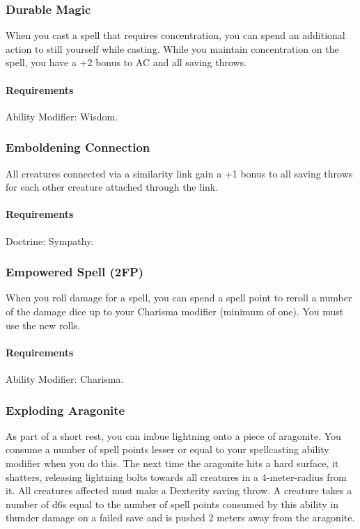 \subsubsection{Durable Magic} \label{feat::durablemagic}
    When you cast a spell that requires concentration, you can spend an additional action to still yourself while casting.
    While you maintain concentration on the spell, you have a +2 bonus to AC and all saving throws.
    \paragraph{Requirements} Ability Modifier: Wisdom.
\subsubsection{Emboldening Connection} \label{feat::emboldeningconnection}
    All creatures connected via a similarity link gain a +1 bonus to all saving throws for each other creature attached through the link.
    \paragraph{Requirements} Doctrine: Sympathy.
\subsubsection{Empowered Spell (2FP)} \label{feat::empoweredspell}
    When you roll damage for a spell, you can spend a spell point to reroll a number of the damage dice up to your Charisma modifier (minimum of one).
    You must use the new rolls.
    \paragraph{Requirements} Ability Modifier: Charisma.
\subsubsection{Exploding Aragonite} \label{feat::explodingaragonite}
    As part of a short rest, you can imbue lightning onto a piece of aragonite.
    You consume a number of spell points lesser or equal to your spellcasting ability modifier when you do this.
    The next time the aragonite hits a hard surface, it shatters, releasing lightning bolts towards all creatures in a 4-meter-radius from it.
    All creatures affected must make a Dexterity saving throw.
    A creature takes a number of d6s equal to the number of spell points consumed by this ability in thunder damage on a failed save and is pushed 2 meters away from the aragonite.

